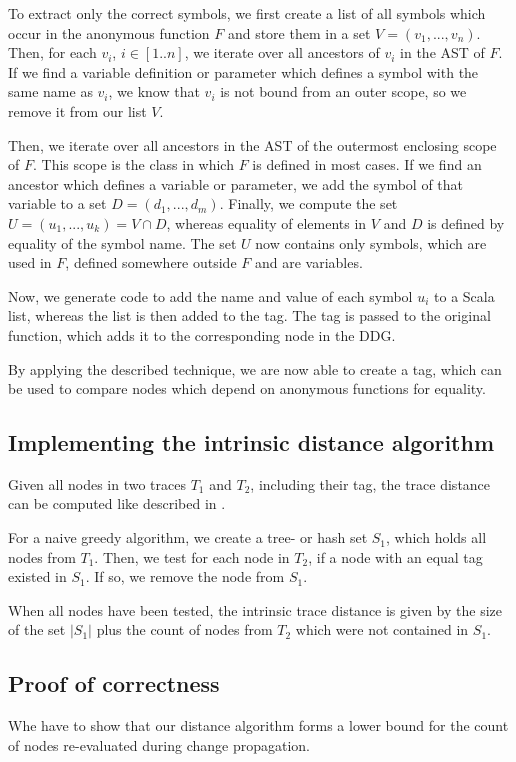 To extract only the correct symbols, we first create a list of all symbols which occur in the anonymous function $F$ and store them in a set $V = (v_1, ..., v_n)$. Then, for each $v_i$, $i \in[1..n]$, we iterate over all ancestors of $v_i$ in the AST of $F$. If we find a variable definition or parameter which defines a symbol with the same name as $v_i$, we know that $v_i$ is not bound from an outer scope, so we remove it from our list $V$.

Then, we iterate over all ancestors in the AST of the outermost enclosing scope of $F$. This scope is the class in which $F$ is defined in most cases. If we find an ancestor which defines a variable or parameter, we add the symbol of that variable to a set $D = (d_1, ..., d_m)$. Finally, we compute the set $U = (u_1, ..., u_k) = V \cap D$, whereas equality of elements in $V$ and $D$ is defined by equality of the symbol name. The set $U$ now contains only symbols, which are used in $F$, defined somewhere outside $F$ and are variables. 

Now, we generate code to add the name and value of each symbol $u_i$ to a Scala list, whereas the list is then added to the tag. The tag is passed to the original function, which adds it to the corresponding node in the DDG.  

By applying the described technique, we are now able to create a tag, which can be used to compare nodes which depend on anonymous functions for equality. 

\subsection{Implementing the intrinsic distance algorithm}
Given all nodes in two traces $T_1$ and $T_2$, including their tag, the trace distance can be computed like described in \cite{Acar2005thesis}.  

For a naive greedy algorithm, we create a tree- or hash set $S_1$, which holds all nodes from $T_1$. Then, we test for each node in $T_2$, if a node with an equal tag existed in $S_1$. If so, we remove the node from $S_1$.

When all nodes have been tested, the intrinsic trace distance is given by the size of the set $|S_1|$ plus the count of nodes from $T_2$ which were not contained in $S_1$. 
\subsection{Proof of correctness}
Whe have to show that our distance algorithm forms a lower bound for the count of nodes re-evaluated during change propagation. 

